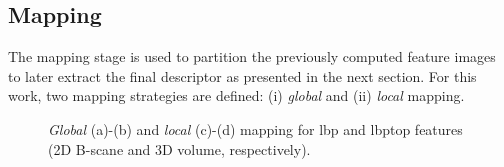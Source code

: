 \begin{table}
\caption{Number of patterns ($LBP_{\#pat}$) for different sampling points and radius ($\{S,R\}$) of the \ac{lbp} descriptor.}
\label{tab:lbphist}
\end{table}

\subsection{Mapping} \label{subsec:mapping}
The mapping stage is used to partition the previously computed feature images to later extract the final descriptor as presented in the next section.
For this work, two mapping strategies are defined: (i) \emph{global} and (ii) \emph{local} mapping.

\begin{figure}[t]
\begin{center}
\hspace*{\fill}
\hfill
{}\hfill
{}\hfill
{}
\hspace*{\fill}
\caption{\emph{Global} (a)-(b) and \emph{local} (c)-(d) mapping for \ac{lbp} and \ac{lbptop} features (2D B-scane and 3D volume, respectively).}
\end{center}
\label{fig:lgmapping}
\end{figure}

